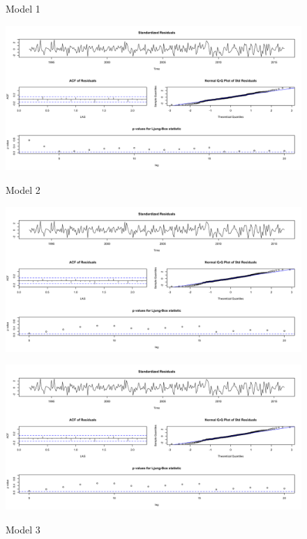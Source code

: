 \documentclass[twoside,twocolumn]{article}
\begin{document}
       \begin{figure}[H]
    	\centering
     	\caption{Model 1}
     	\includegraphics[width=\linewidth]{images/sarima1}
     	\label{fig:sarima1}
     	     	\caption{Model 2}
     	\includegraphics[width=\linewidth]{images/sarima2}
     	\label{fig:sarima2}
     	    	\caption{Model 3}
     	\includegraphics[width=\linewidth]{images/sarima3}
     	\label{fig:sarima3}
      \end{figure}
      
      
      
\end{document}
